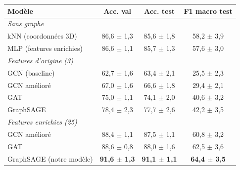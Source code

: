 \begin{tabular}{l c c c}
\hline
Modèle & Acc. val & Acc. test & F1 macro test \\
\hline
\multicolumn{4}{l}{\emph{Sans graphe}} \\
kNN (coordonnées 3D) & 86,6 $\pm$ 1,3 & 85,6 $\pm$ 1,8 & 58,2 $\pm$ 3,9 \\
MLP (features enrichies) & 86,6 $\pm$ 1,1 & 85,7 $\pm$ 1,3 & 57,6 $\pm$ 3,0 \\
\hline
\multicolumn{4}{l}{\emph{Features d'origine (3)}} \\
GCN (baseline) & 62,7 $\pm$ 1,6 & 63,4 $\pm$ 2,1 & 25,5 $\pm$ 2,3 \\
GCN amélioré & 67,0 $\pm$ 1,6 & 66,6 $\pm$ 1,8 & 29,4 $\pm$ 2,1 \\
GAT & 75,0 $\pm$ 1,1 & 74,1 $\pm$ 2,0 & 40,6 $\pm$ 3,2 \\
GraphSAGE & 78,4 $\pm$ 2,3 & 77,7 $\pm$ 2,6 & 42,2 $\pm$ 3,5 \\
\hline
\multicolumn{4}{l}{\emph{Features enrichies (25)}} \\
GCN amélioré & 88,4 $\pm$ 1,1 & 87,5 $\pm$ 1,1 & 60,8 $\pm$ 3,2 \\
GAT & 88,6 $\pm$ 0,8 & 88,0 $\pm$ 1,6 & 62,5 $\pm$ 3,6 \\
GraphSAGE (notre modèle) & \textbf{91,6 $\pm$ 1,3} & \textbf{91,1 $\pm$ 1,1} & \textbf{64,4 $\pm$ 3,5} \\
\hline
\end{tabular}
